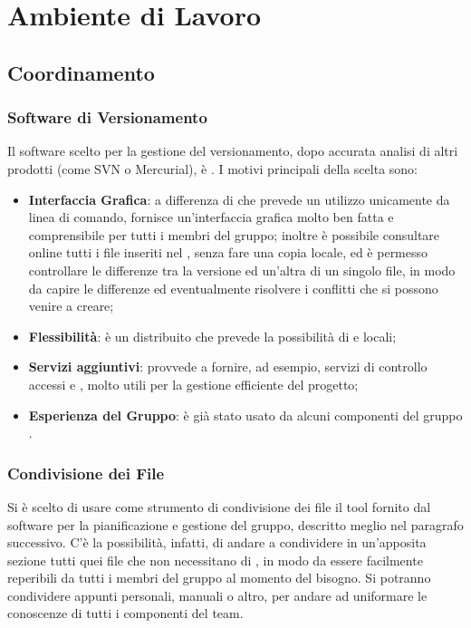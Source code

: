 \section{Ambiente di Lavoro}

\subsection{Coordinamento}
\subsubsection{Software di Versionamento}

Il software scelto per la gestione del versionamento, dopo accurata analisi di altri prodotti (come SVN o Mercurial), è . I motivi principali della scelta sono:
\begin{itemize}
\item \textbf{Interfaccia Grafica}: a differenza di  che prevede un utilizzo unicamente da linea di comando,  fornisce un'interfaccia grafica molto ben fatta e comprensibile per tutti i membri del gruppo; inoltre è possibile consultare online tutti i file inseriti nel , senza fare una copia locale, ed è permesso controllare le differenze tra la versione ed un'altra di un singolo file, in modo da capire le differenze ed eventualmente risolvere i conflitti che si possono venire a creare;
\item \textbf{Flessibilità}:  è un  distribuito che prevede la possibilità di  e  locali;
\item \textbf{Servizi aggiuntivi}:  provvede a fornire, ad esempio, servizi di controllo accessi e , molto utili per la gestione efficiente del progetto;
\item \textbf{Esperienza del Gruppo}:  è già stato usato da alcuni componenti del gruppo \GroupName{}.
\end{itemize}

\subsubsection{Condivisione dei File}
Si è scelto di usare come strumento di condivisione dei file il tool fornito dal software per la pianificazione e gestione del gruppo, descritto meglio nel paragrafo successivo. C'è la possibilità, infatti, di andare a condividere in un'apposita sezione  tutti quei file che non necessitano di , in modo da essere facilmente reperibili da tutti i membri del gruppo al momento del bisogno. Si potranno condividere appunti personali, manuali o altro, per andare ad uniformare le conoscenze di tutti i componenti del team.


